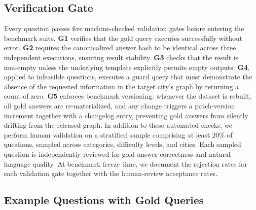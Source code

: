 \documentclass[sigconf,authordraft]{acmart}
\begin{document}
\subsection{Verification Gate}\label{app:questions_gate}

Every question passes five machine-checked validation gates before entering the benchmark suite. \textbf{G1} verifies that the gold query executes successfully without error. \textbf{G2} requires the canonicalized answer hash to be identical across three independent executions, ensuring result stability. \textbf{G3} checks that the result is non-empty unless the underlying template explicitly permits empty outputs. \textbf{G4}, applied to infeasible questions, executes a guard query that must demonstrate the absence of the requested information in the target city's graph by returning a count of zero. \textbf{G5} enforces benchmark versioning: whenever the dataset is rebuilt, all gold answers are re-materialized, and any change triggers a patch-version increment together with a changelog entry, preventing gold answers from silently drifting from the released graph. In addition to these automated checks, we perform human validation on a stratified sample comprising at least 20\% of questions, sampled across categories, difficulty levels, and cities. Each sampled question is independently reviewed 
for gold-answer correctness and natural language quality.
At benchmark freeze time, we document the rejection rates for each validation gate together with the human-review acceptance rates.

\subsection{Example Questions with Gold Queries}\label{app:questions_examples}
\end{document}
